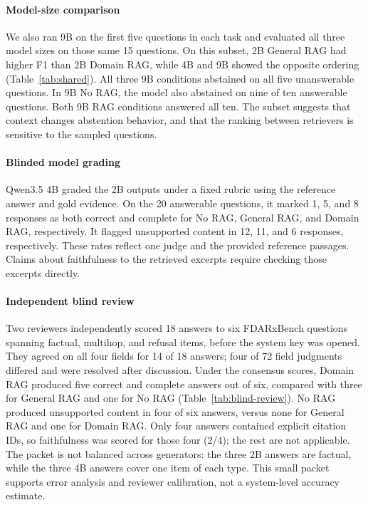 \documentclass[11pt]{article}
\begin{document}
\paragraph{Model-size comparison}
We also ran 9B on the first five questions in each task and evaluated all three model sizes on those same 15 questions. On this subset, 2B General RAG had higher F1 than 2B Domain RAG, while 4B and 9B showed the opposite ordering (Table~\ref{tab:shared}). All three 9B conditions abstained on all five unanswerable questions. In 9B No RAG, the model also abstained on nine of ten answerable questions. Both 9B RAG conditions answered all ten. The subset suggests that context changes abstention behavior, and that the ranking between retrievers is sensitive to the sampled questions.

\paragraph{Blinded model grading}
Qwen3.5 4B graded the 2B outputs under a fixed rubric using the reference answer and gold evidence. On the 20 answerable questions, it marked 1, 5, and 8 responses as both correct and complete for No RAG, General RAG, and Domain RAG, respectively. It flagged unsupported content in 12, 11, and 6 responses, respectively. These rates reflect one judge and the provided reference passages. Claims about faithfulness to the retrieved excerpts require checking those excerpts directly.

\paragraph{Independent blind review}
Two reviewers independently scored 18 answers to six FDARxBench questions spanning factual, multihop, and refusal items, before the system key was opened. They agreed on all four fields for 14 of 18 answers; four of 72 field judgments differed and were resolved after discussion. Under the consensus scores, Domain RAG produced five correct and complete answers out of six, compared with three for General RAG and one for No RAG (Table~\ref{tab:blind-review}). No RAG produced unsupported content in four of six answers, versus none for General RAG and one for Domain RAG. Only four answers contained explicit citation IDs, so faithfulness was scored for those four (2/4); the rest are not applicable. The packet is not balanced across generators: the three 2B answers are factual, while the three 4B answers cover one item of each type. This small packet supports error analysis and reviewer calibration, not a system-level accuracy estimate.

\end{document}
